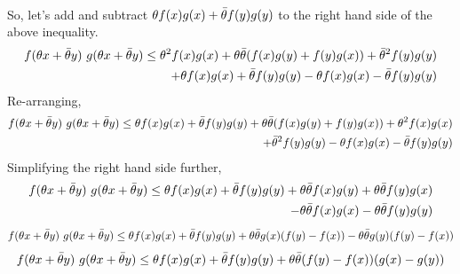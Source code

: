 \documentclass[12pt, draftcls, onecolumn]{IEEEtran}
\begin{document}
\begin{enumerate}
    \\So, let's add and subtract $\theta f(x)g(x) + \Bar{\theta} f(y)g(y)$ to the right hand side of the above inequality.
    \begin{equation*}
        \begin{aligned}
            f(\theta x+\Bar{\theta} y)\ g(\theta x+\Bar{\theta} y) \leq \theta^2 f(x)g(x) + \theta \Bar{\theta} (f(x)g(y) + f(y)g(x)) + \Bar{\theta}^2 f(y)g(y) \\+ \theta f(x)g(x) + \Bar{\theta} f(y)g(y) - \theta f(x)g(x) - \Bar{\theta} f(y)g(y)
        \end{aligned}
    \end{equation*}
    Re-arranging,
    \begin{equation*}
        \begin{aligned}
            f(\theta x+\Bar{\theta} y)\ g(\theta x+\Bar{\theta} y) \leq \theta f(x)g(x) + \Bar{\theta} f(y)g(y) + \theta \Bar{\theta} (f(x)g(y) + f(y)g(x)) + \theta^2 f(x)g(x) \\+ \Bar{\theta}^2 f(y)g(y) - \theta f(x)g(x) - \Bar{\theta} f(y)g(y)
        \end{aligned}
    \end{equation*}
    Simplifying the right hand side further,
    \begin{equation*}
        \begin{aligned}
            f(\theta x+\Bar{\theta} y)\ g(\theta x+\Bar{\theta} y) \leq \theta f(x)g(x) + \Bar{\theta} f(y)g(y) + \theta \Bar{\theta} f(x)g(y) + \theta \Bar{\theta} f(y)g(x) \\- \theta \Bar{\theta} f(x)g(x) - \theta \Bar{\theta} f(y)g(y)
        \end{aligned}
    \end{equation*}
    \begin{equation*}
        \begin{aligned}
            f(\theta x+\Bar{\theta} y)\ g(\theta x+\Bar{\theta} y) \leq \theta f(x)g(x) + \Bar{\theta} f(y)g(y) + \theta \Bar{\theta} g(x)(f(y)-f(x)) - \theta \Bar{\theta} g(y)(f(y)-f(x))
        \end{aligned}
    \end{equation*}
    \begin{equation*}
        \begin{aligned}
            f(\theta x+\Bar{\theta} y)\ g(\theta x+\Bar{\theta} y) \leq \theta f(x)g(x) + \Bar{\theta} f(y)g(y) + \theta \Bar{\theta} (f(y)-f(x))(g(x)-g(y))
        \end{aligned}

\end{equation*}
\end{enumerate}
\end{document}
